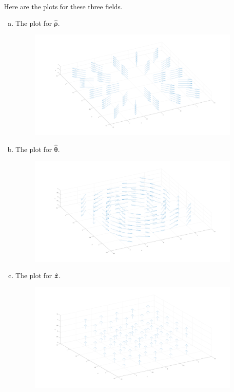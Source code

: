 \documentclass[12pt]{article} %
\newcommand{\thetahat}{\boldsymbol{\hat{\theta}}}
\newcommand{\rhohat}{\boldsymbol{\hat{\rho}}}
\begin{document}
\begin{solution} Here are the plots for these three fields.

\begin{enumerate}[(a)]
    \item The plot for $\rhohat$.
    \begin{figure}[H]
        \centering
        \includegraphics[width=\textwidth]{rho_hat.png}
    \end{figure}
    \item The plot for $\thetahat$.
    \begin{figure}[H]
        \centering
        \includegraphics[width=\textwidth]{theta_hat.png}
    \end{figure}
    \item The plot for $\boldsymbol{\hat{z}}$.
    \begin{figure}[H]
        \centering
        \includegraphics[width=\textwidth]{z_hat.png}
    \end{figure}        
\end{enumerate}

\end{solution}
\end{document}
